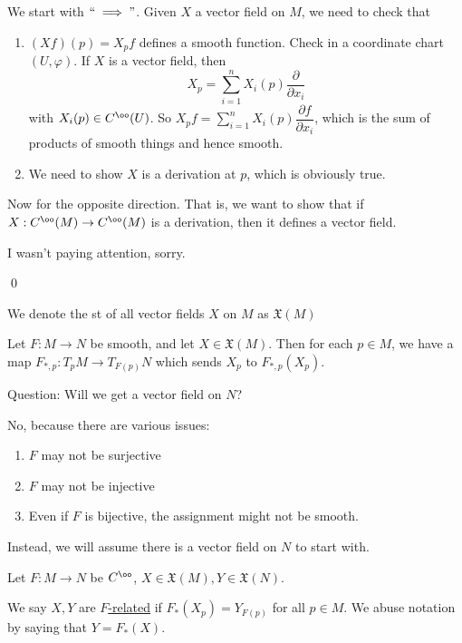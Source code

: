 \documentclass[x11names,reqno,14pt]{extarticle}
\newcommand{\pp}[2]{\dfrac{\partial #1}{\partial #2}}
\renewcommand{\phi}{\varphi}
\begin{document}
\proof

We start with $``\implies"$. Given $X$ a vector field on $M$, we need to check that 

\begin{enumerate}

\item $(Xf)(p) = X_pf$ defines a smooth function. Check in a coordinate chart $(U, \phi)$. If $X$ is a vector field, then
\[
X_p = \sum_{i=1}^n X_i(p) \pp{}{x_i}
\]
with $X_i(p) \in C^\oo(U)$. So $X_pf = \sum_{i=1}^n X_i(p)\pp{f}{x_i}$, which is the sum of products of smooth things and hence smooth. 

\item We need to show $X$ is a derivation at $p$, which is obviously true. 

\end{enumerate}

Now for the opposite direction. That is, we want to show that if $X:C^\oo(M)\to C^\oo(M)$ is a derivation, then it defines a vector field. 

I wasn't paying attention, sorry. 

\qed

We denote the st of all vector fields $X$ on $M$ as $\mathfrak{X}(M)$

Let $F:M\to N$ be smooth, and let $X \in \mathfrak{X}(M)$. Then for each $p \in M$, we have a map $F_{*,p}:T_pM\to T_{F(p)}N$ which sends $X_p$ to $F_{*,p}(X_p)$. 

Question: Will we get a vector field on $N$?

No, because there are various issues:

\begin{enumerate}

\item $F$ may not be surjective

\item $F$ may not be injective 

\item Even if $F$ is bijective, the assignment might not be smooth. 


\end{enumerate}


Instead, we will assume there is a vector field on $N$ to start with. 


Let $F:M\to N$ be $C^\oo$, $X \in \mathfrak{X}(M), Y \in \mathfrak{X}(N)$. 

We say $X, Y$ are \underline{$F$-related} if $F_*(X_p) = Y_{F(p)}$ for all $p \in M$. We abuse notation by saying that $Y = F_*(X)$. 
\end{document}
